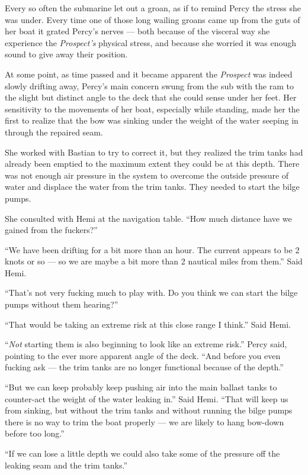 \documentclass[]{scrbook}
\begin{document}
Every so often the submarine let out a groan, as if to remind Percy the
stress she was under. Every time one of those long wailing groans came
up from the guts of her boat it grated Percy's nerves --- both because
of the visceral way she experience the \emph{Prospect's} physical
stress, and because she worried it was enough sound to give away their
position.

At some point, as time passed and it became apparent the \emph{Prospect}
was indeed slowly drifting away, Percy's main concern swung from the sub
with the ram to the slight but distinct angle to the deck that she could
sense under her feet. Her sensitivity to the movements of her boat,
especially while standing, made her the first to realize that the bow
was sinking under the weight of the water seeping in through the
repaired seam.

She worked with Bastian to try to correct it, but they realized the trim
tanks had already been emptied to the maximum extent they could be at
this depth. There was not enough air pressure in the system to overcome
the outside pressure of water and displace the water from the trim
tanks. They needed to start the bilge pumps.

She consulted with Hemi at the navigation table. ``How much distance
have we gained from the fuckers?''

``We have been drifting for a bit more than an hour. The current appears
to be 2 knots or so --- so we are maybe a bit more than 2 nautical miles
from them.'' Said Hemi.

``That's not very fucking much to play with. Do you think we can start
the bilge pumps without them hearing?''

``That would be taking an extreme risk at this close range I think.''
Said Hemi.

``\emph{Not} starting them is also beginning to look like an extreme
risk.'' Percy said, pointing to the ever more apparent angle of the
deck. ``And before you even fucking ask --- the trim tanks are no longer
functional because of the depth.''

``But we can keep probably keep pushing air into the main ballast tanks
to counter-act the weight of the water leaking in.'' Said Hemi. ``That
will keep us from sinking, but without the trim tanks and without
running the bilge pumps there is no way to trim the boat properly --- we
are likely to hang bow-down before too long.''

``If we can lose a little depth we could also take some of the pressure
off the leaking seam and the trim tanks.''
\end{document}
